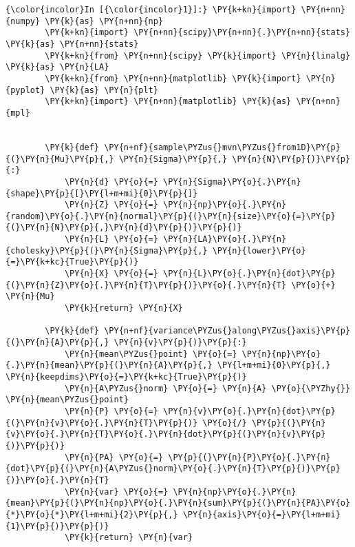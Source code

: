     \begin{Verbatim}[commandchars=\\\{\}]
{\color{incolor}In [{\color{incolor}1}]:} \PY{k+kn}{import} \PY{n+nn}{numpy} \PY{k}{as} \PY{n+nn}{np}
        \PY{k+kn}{import} \PY{n+nn}{scipy}\PY{n+nn}{.}\PY{n+nn}{stats} \PY{k}{as} \PY{n+nn}{stats}
        \PY{k+kn}{from} \PY{n+nn}{scipy} \PY{k}{import} \PY{n}{linalg} \PY{k}{as} \PY{n}{LA}
        \PY{k+kn}{from} \PY{n+nn}{matplotlib} \PY{k}{import} \PY{n}{pyplot} \PY{k}{as} \PY{n}{plt}
        \PY{k+kn}{import} \PY{n+nn}{matplotlib} \PY{k}{as} \PY{n+nn}{mpl}
        
        
        \PY{k}{def} \PY{n+nf}{sample\PYZus{}mvn\PYZus{}from1D}\PY{p}{(}\PY{n}{Mu}\PY{p}{,} \PY{n}{Sigma}\PY{p}{,} \PY{n}{N}\PY{p}{)}\PY{p}{:}
            \PY{n}{d} \PY{o}{=} \PY{n}{Sigma}\PY{o}{.}\PY{n}{shape}\PY{p}{[}\PY{l+m+mi}{0}\PY{p}{]}
            \PY{n}{Z} \PY{o}{=} \PY{n}{np}\PY{o}{.}\PY{n}{random}\PY{o}{.}\PY{n}{normal}\PY{p}{(}\PY{n}{size}\PY{o}{=}\PY{p}{(}\PY{n}{N}\PY{p}{,}\PY{n}{d}\PY{p}{)}\PY{p}{)}
            \PY{n}{L} \PY{o}{=} \PY{n}{LA}\PY{o}{.}\PY{n}{cholesky}\PY{p}{(}\PY{n}{Sigma}\PY{p}{,} \PY{n}{lower}\PY{o}{=}\PY{k+kc}{True}\PY{p}{)}
            \PY{n}{X} \PY{o}{=} \PY{n}{L}\PY{o}{.}\PY{n}{dot}\PY{p}{(}\PY{n}{Z}\PY{o}{.}\PY{n}{T}\PY{p}{)}\PY{o}{.}\PY{n}{T} \PY{o}{+} \PY{n}{Mu}
            \PY{k}{return} \PY{n}{X}
        
        \PY{k}{def} \PY{n+nf}{variance\PYZus{}along\PYZus{}axis}\PY{p}{(}\PY{n}{A}\PY{p}{,} \PY{n}{v}\PY{p}{)}\PY{p}{:}
            \PY{n}{mean\PYZus{}point} \PY{o}{=} \PY{n}{np}\PY{o}{.}\PY{n}{mean}\PY{p}{(}\PY{n}{A}\PY{p}{,} \PY{l+m+mi}{0}\PY{p}{,} \PY{n}{keepdims}\PY{o}{=}\PY{k+kc}{True}\PY{p}{)}
            \PY{n}{A\PYZus{}norm} \PY{o}{=} \PY{n}{A} \PY{o}{\PYZhy{}} \PY{n}{mean\PYZus{}point}
            \PY{n}{P} \PY{o}{=} \PY{n}{v}\PY{o}{.}\PY{n}{dot}\PY{p}{(}\PY{n}{v}\PY{o}{.}\PY{n}{T}\PY{p}{)} \PY{o}{/} \PY{p}{(}\PY{n}{v}\PY{o}{.}\PY{n}{T}\PY{o}{.}\PY{n}{dot}\PY{p}{(}\PY{n}{v}\PY{p}{)}\PY{p}{)}
            \PY{n}{PA} \PY{o}{=} \PY{p}{(}\PY{n}{P}\PY{o}{.}\PY{n}{dot}\PY{p}{(}\PY{n}{A\PYZus{}norm}\PY{o}{.}\PY{n}{T}\PY{p}{)}\PY{p}{)}\PY{o}{.}\PY{n}{T}
            \PY{n}{var} \PY{o}{=} \PY{n}{np}\PY{o}{.}\PY{n}{mean}\PY{p}{(}\PY{n}{np}\PY{o}{.}\PY{n}{sum}\PY{p}{(}\PY{n}{PA}\PY{o}{*}\PY{o}{*}\PY{l+m+mi}{2}\PY{p}{,} \PY{n}{axis}\PY{o}{=}\PY{l+m+mi}{1}\PY{p}{)}\PY{p}{)}
            \PY{k}{return} \PY{n}{var}
        

\end{Verbatim}
